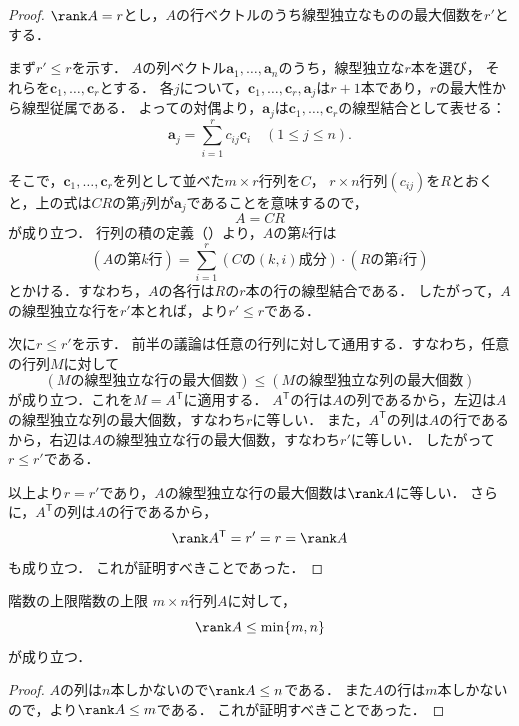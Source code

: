 \begin{leftbar}
\begin{proof}
  $\rank A = r$とし，$A$の行ベクトルのうち線型独立なものの最大個数を$r'$とする．

  まず$r' \le r$を示す．
  $A$の列ベクトル$\bm{a}_1, \dots, \bm{a}_n$のうち，線型独立な$r$本を選び，
  それらを$\bm{c}_1, \dots, \bm{c}_r$とする．
  各$j$について，$\bm{c}_1, \dots, \bm{c}_r, \bm{a}_j$は$r + 1$本であり，$r$の最大性から線型従属である．
  よっての対偶より，$\bm{a}_j$は$\bm{c}_1, \dots, \bm{c}_r$の線型結合として表せる：
  \[
    \bm{a}_j = \sum_{i=1}^{r} c_{ij} \bm{c}_i \quad (1 \le j \le n).
  \]

  そこで，$\bm{c}_1, \dots, \bm{c}_r$を列として並べた$m \times r$行列を$C$，
  $r \times n$行列$(c_{ij})$を$R$とおくと，上の式は$CR$の第$j$列が$\bm{a}_j$であることを意味するので，
  \[
    A = CR
  \]
  が成り立つ．
  行列の積の定義（）より，$A$の第$k$行は
  \[
    (A \text{の第}k\text{行}) = \sum_{i=1}^{r} (C \text{の}(k,i)\text{成分}) \cdot (R \text{の第}i\text{行})
  \]
  とかける．すなわち，$A$の各行は$R$の$r$本の行の線型結合である．
  したがって，$A$の線型独立な行を$r'$本とれば，より$r' \le r$である．

  次に$r \le r'$を示す．
  前半の議論は任意の行列に対して通用する．すなわち，任意の行列$M$に対して
  \[
    (M\text{の線型独立な行の最大個数})
    \le
    (M\text{の線型独立な列の最大個数})
  \]
  が成り立つ．これを$M = A^\mathsf{T}$に適用する．
  $A^\mathsf{T}$の行は$A$の列であるから，左辺は$A$の線型独立な列の最大個数，すなわち$r$に等しい．
  また，$A^\mathsf{T}$の列は$A$の行であるから，右辺は$A$の線型独立な行の最大個数，すなわち$r'$に等しい．
  したがって$r \le r'$である．

  以上より$r = r'$であり，$A$の線型独立な行の最大個数は$\rank A$に等しい．
  さらに，$A^\mathsf{T}$の列は$A$の行であるから，
  \[
    \rank A^\mathsf{T} = r' = r = \rank A
  \]
  も成り立つ．
  これが証明すべきことであった．
\end{proof}
\end{leftbar}

\begin{cor}{階数の上限}{階数の上限}
  $m \times n$行列$A$に対して，
  \[
    \rank A \le \min\{m, n\}
  \]
  が成り立つ．
\end{cor}

\begin{leftbar}
\begin{proof}
  $A$の列は$n$本しかないので$\rank A \le n$である．
  また$A$の行は$m$本しかないので，より$\rank A \le m$である．
  これが証明すべきことであった．
\end{proof}
\end{leftbar}

